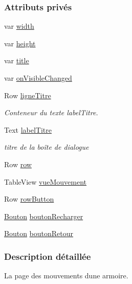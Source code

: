 \subsubsection*{Attributs privés}
\begin{DoxyCompactItemize}
\item 
var \hyperlink{class_mouvements_armoire_a6ea7c9a4030b402d488dc68c91606497}{width}
\item 
var \hyperlink{class_mouvements_armoire_ad049490aa2734346a9c173c89b0f4154}{height}
\item 
var \hyperlink{class_mouvements_armoire_a33395c2a27315facc43928c50231e263}{title}
\item 
var \hyperlink{class_mouvements_armoire_adc1855c1619aee0c32af5b1b29964a75}{on\+Visible\+Changed}
\item 
Row \hyperlink{class_mouvements_armoire_af2b00c7c7d6bc3f45f309727166def50}{ligne\+Titre}
\begin{DoxyCompactList}\small\item\em Conteneur du texte label\+Titre. \end{DoxyCompactList}\item 
Text \hyperlink{class_mouvements_armoire_a11fc505b1ed1b6cd165f6ebc069eaefc}{label\+Titre}
\begin{DoxyCompactList}\small\item\em titre de la boîte de dialogue \end{DoxyCompactList}\item 
Row \hyperlink{class_mouvements_armoire_a06f9a2ecb5f50a338c6eabf9ccf98ad7}{row}
\item 
Table\+View \hyperlink{class_mouvements_armoire_af18b782cf5c822bb03ca9e23212a5850}{vue\+Mouvement}
\item 
Row \hyperlink{class_mouvements_armoire_a5367e0eda0548b287722ada0466f1489}{row\+Button}
\item 
\hyperlink{class_bouton}{Bouton} \hyperlink{class_mouvements_armoire_af1f5f11ac046423748fdc511cbbafc9c}{bouton\+Recharger}
\item 
\hyperlink{class_bouton}{Bouton} \hyperlink{class_mouvements_armoire_ad3d4d57ce419f5d266cbc13821e97395}{bouton\+Retour}
\end{DoxyCompactItemize}


\subsubsection{Description détaillée}
La page des mouvements d\textquotesingle{}une armoire.

